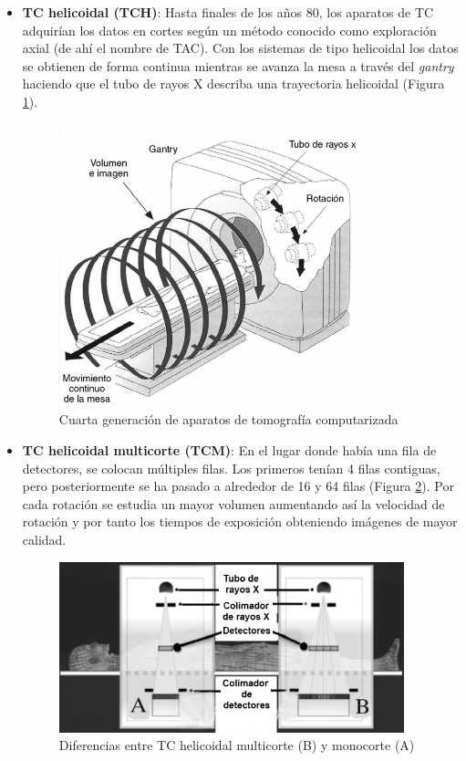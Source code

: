 \begin{itemize}
	\item \textbf{TC helicoidal (TCH)}: Hasta finales de los años 80, los aparatos de TC adquirían los datos en cortes según un método conocido como exploración axial (de ahí el nombre de TAC). Con los sistemas de tipo helicoidal los datos se obtienen de forma continua mientras se avanza la mesa a través del \textit{gantry} haciendo que el tubo de rayos X describa una trayectoria helicoidal (Figura \ref{fig:introduccion/tch}).
	
	\begin{figure}[H]
		\centering
		\includegraphics[width=9cm]{imagenes/introduccion/tch}
		\caption{Cuarta generación de aparatos de tomografía computarizada \cite{garcia14}}
		\label{fig:introduccion/tch}
	\end{figure}
	
	\item \textbf{TC helicoidal multicorte (TCM)}: En el lugar donde había una fila de detectores, se colocan múltiples filas. Los primeros tenían 4 filas contiguas, pero posteriormente se ha pasado a alrededor de 16 y 64 filas (Figura \ref{fig:introduccion/tcm}). Por cada rotación se estudia un mayor volumen aumentando así la velocidad de rotación y por tanto los tiempos de exposición obteniendo imágenes de mayor calidad.
	
	\begin{figure}[H]
		\centering
		\includegraphics[width=10cm]{imagenes/introduccion/tcm}
		\caption{Diferencias entre TC helicoidal multicorte (B) y monocorte (A) \cite{sarrio16}}
		\label{fig:introduccion/tcm}
	\end{figure}


\end{itemize}

